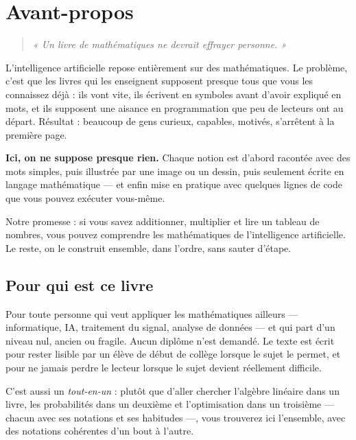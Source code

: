 \chapter*{Avant-propos}

\begin{quote}
\itshape « Un livre de mathématiques ne devrait effrayer personne. »
\end{quote}

L'intelligence artificielle repose entièrement sur des mathématiques. Le
problème, c'est que les livres qui les enseignent supposent presque tous
que vous les connaissez déjà : ils vont vite, ils écrivent en symboles
avant d'avoir expliqué en mots, et ils supposent une aisance en
programmation que peu de lecteurs ont au départ. Résultat : beaucoup de
gens curieux, capables, motivés, s'arrêtent à la première page.

\textbf{Ici, on ne suppose presque rien.} Chaque notion est d'abord
racontée avec des mots simples, puis illustrée par une image ou un
dessin, puis seulement écrite en langage mathématique — et enfin mise en
pratique avec quelques lignes de code que vous pouvez exécuter vous-même.

\begin{enclair}
Notre promesse : si vous savez additionner, multiplier et lire un tableau
de nombres, vous pouvez comprendre les mathématiques de l'intelligence
artificielle. Le reste, on le construit ensemble, dans l'ordre, sans
sauter d'étape.
\end{enclair}

\section*{Pour qui est ce livre}

Pour toute personne qui veut appliquer les mathématiques ailleurs —
informatique, IA, traitement du signal, analyse de données — et qui part
d'un niveau nul, ancien ou fragile. Aucun diplôme n'est demandé. Le texte
est écrit pour rester lisible par un élève de début de collège lorsque le
sujet le permet, et pour ne jamais perdre le lecteur lorsque le sujet
devient réellement difficile.

C'est aussi un \emph{tout-en-un} : plutôt que d'aller chercher l'algèbre
linéaire dans un livre, les probabilités dans un deuxième et
l'optimisation dans un troisième — chacun avec ses notations et ses
habitudes —, vous trouverez ici l'ensemble, avec des notations
cohérentes d'un bout à l'autre.

